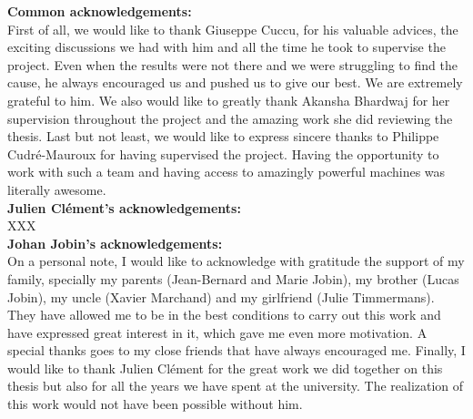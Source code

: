 
\textbf{Common acknowledgements:}\\
First of all, we would like to thank Giuseppe Cuccu, for his valuable advices, the exciting discussions we had with him and all the time he took to supervise the project. Even when the results were not there and we were struggling to find the cause, he always encouraged us and pushed us to give our best. We are extremely grateful to him. We also would like to greatly thank Akansha Bhardwaj for her supervision throughout the project and the amazing work she did reviewing the thesis. Last but not least, we would like to express sincere thanks to Philippe Cudré-Mauroux for having supervised the project. Having the opportunity to work with such a team and having access to amazingly powerful machines was literally awesome.\\

\noindent \textbf{Julien Clément's acknowledgements:}\\
XXX\\

\noindent \textbf{Johan Jobin's acknowledgements:}\\
On a personal note, I would like to acknowledge with gratitude the support of my family, specially my parents (Jean-Bernard and Marie Jobin), my brother (Lucas Jobin), my uncle (Xavier Marchand) and my girlfriend (Julie Timmermans). They have allowed me to be in the best conditions to carry out this work and have expressed great interest in it, which gave me even more motivation. A special thanks goes to my close friends that have always encouraged me. Finally, I would like to thank Julien Clément for the great work we did together on this thesis but also for all the years we have spent at the university. The realization of this work would not have been possible without him.